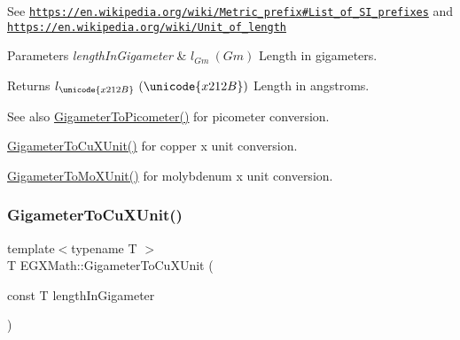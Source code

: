 See \href{https://en.wikipedia.org/wiki/Metric_prefix#List_of_SI_prefixes}{\tt https\+://en.\+wikipedia.\+org/wiki/\+Metric\+\_\+prefix\#\+List\+\_\+of\+\_\+\+S\+I\+\_\+prefixes} and \href{https://en.wikipedia.org/wiki/Unit_of_length}{\tt https\+://en.\+wikipedia.\+org/wiki/\+Unit\+\_\+of\+\_\+length} 
\begin{DoxyParams}{Parameters}
{\em length\+In\+Gigameter} & $ l_{Gm}\ (Gm)$ Length in gigameters. \\
\hline
\end{DoxyParams}
\begin{DoxyReturn}{Returns}
$ l_{\unicode{x212B}}\ (\unicode{x212B})$ Length in angstroms. 
\end{DoxyReturn}
\begin{DoxySeeAlso}{See also}
\mbox{\hyperlink{group___e_g_x_math-_conversions-_length_conversions-_gigameter-_s_i_gae9cea35a0ce747d02ec8b6cf7bfeaa7e}{Gigameter\+To\+Picometer()}} for picometer conversion. 

\mbox{\hyperlink{group___e_g_x_math-_conversions-_length_conversions-_gigameter-_non-_s_i_gab542297b31676ef5b3cf62f0c63a6f20}{Gigameter\+To\+Cu\+X\+Unit()}} for copper x unit conversion. 

\mbox{\hyperlink{group___e_g_x_math-_conversions-_length_conversions-_gigameter-_non-_s_i_gac30ae06633de77b05d859ffb3cd2a577}{Gigameter\+To\+Mo\+X\+Unit()}} for molybdenum x unit conversion. 
\end{DoxySeeAlso}
\mbox{\label{group___e_g_x_math-_conversions-_length_conversions-_gigameter-_non-_s_i_gab542297b31676ef5b3cf62f0c63a6f20}} 
\subsubsection{\texorpdfstring{Gigameter\+To\+Cu\+X\+Unit()}{GigameterToCuXUnit()}}
{\footnotesize\ttfamily template$<$typename T $>$ \\
T E\+G\+X\+Math\+::\+Gigameter\+To\+Cu\+X\+Unit (\begin{DoxyParamCaption}\item[{const T}]{length\+In\+Gigameter }\end{DoxyParamCaption})}




